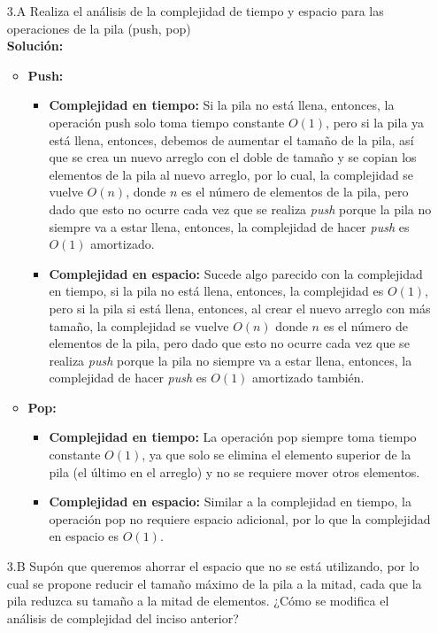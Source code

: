 \documentclass[12pt]{article}
\begin{document}
\begin{itemize}
    \item[3.A] Realiza el análisis de la complejidad de tiempo y espacio para las operaciones de la pila (push, pop)\\
    \textbf{Solución:}
    \begin{itemize}
        \item \textbf{Push:}
        \begin{itemize}
            \item \textbf{Complejidad en tiempo:} Si la pila no está llena, entonces, la operación push solo toma tiempo constante $O(1)$, pero si la pila ya está llena, entonces, debemos de aumentar el tamaño de la pila, así que se crea un nuevo arreglo con el doble de tamaño y se copian los elementos de la pila al nuevo arreglo, por lo cual, la complejidad se vuelve $O(n)$, donde $n$ es el número de elementos de la pila, pero dado que esto no ocurre cada vez que se realiza \textit{push} porque la pila no siempre va a estar llena, entonces, la complejidad de hacer \textit{push} es $O(1)$ amortizado.
            \item \textbf{Complejidad en espacio:} Sucede algo parecido con la complejidad en tiempo, si la pila no está llena, entonces, la complejidad es $O(1)$, pero si la pila si está llena, entonces, al crear el nuevo arreglo con más tamaño, la complejidad se vuelve $O(n)$ donde $n$ es el número de elementos de la pila, pero dado que esto no ocurre cada vez que se realiza \textit{push} porque la pila no siempre va a estar llena, entonces, la complejidad de hacer \textit{push} es $O(1)$ amortizado también.
        \end{itemize}
        \item \textbf{Pop:}
        \begin{itemize}
            \item \textbf{Complejidad en tiempo:} La operación pop siempre toma tiempo constante $O(1)$, ya que solo se elimina el elemento superior de la pila (el último en el arreglo) y no se requiere mover otros elementos.
            \item \textbf{Complejidad en espacio:} Similar a la complejidad en tiempo, la operación pop no requiere espacio adicional, por lo que la complejidad en espacio es $O(1)$.
        \end{itemize}
    \end{itemize}
    \item[3.B] Supón que queremos ahorrar el espacio que no se está utilizando, por lo cual se propone reducir el tamaño máximo de la pila a la mitad, cada que la pila reduzca su tamaño a la mitad de elementos. ¿Cómo se modifica el análisis de complejidad del inciso anterior?\\

\end{itemize}
\end{document}
